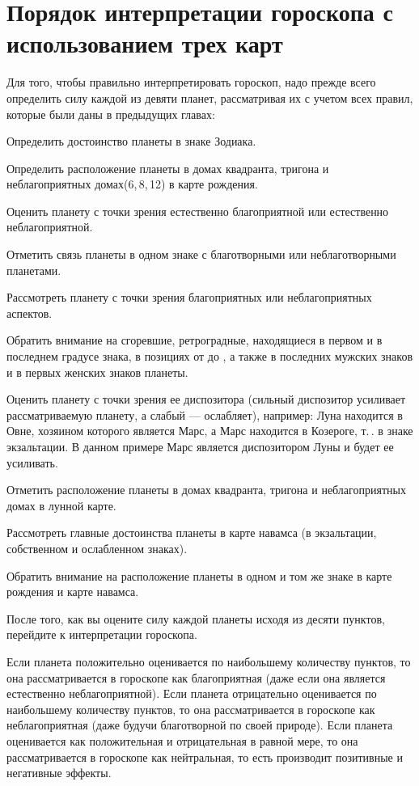 \section{Порядок интерпретации гороскопа с использованием трех карт}

Для того, чтобы правильно интерпретировать гороскоп, надо прежде всего определить силу каждой из девяти планет, рассматривая их с учетом всех правил, которые были даны в предыдущих главах:
\begin{myenum}
	\item Определить достоинство планеты в знаке Зодиака.
	\item Определить расположение планеты в домах квадранта, тригона и неблагоприятных домах(6,\,8,\,12) в карте рождения.
	\item Оценить планету с точки зрения естественно благоприятной или естественно неблагоприятной.
	\item Отметить связь планеты в одном знаке с благотворными или неблаготворными планетами.
	\item Рассмотреть планету с точки зрения благоприятных или неблагоприятных аспектов.
	\item Обратить внимание на сгоревшие, ретроградные, находящиеся в первом и в последнем градусе знака, в позициях от  до , а также в последних  мужских знаков и в первых  женских знаков планеты.
	\item Оценить планету с точки зрения ее диспозитора (сильный диспозитор усиливает рассматриваемую планету, а слабый --- ослабляет), например: Луна находится в Овне, хозяином которого является Марс, а Марс находится в Козероге, т.\,\е. в знаке экзальтации. В данном примере Марс является диспозитором Луны и будет ее усиливать.
	\item Отметить расположение планеты в домах квадранта, тригона и неблагоприятных домах в лунной карте.
	\item Рассмотреть главные достоинства планеты в карте навамса (в экзальтации, собственном и ослабленном знаках).
	\item Обратить внимание на расположение планеты в одном и том же знаке в карте рождения и карте навамса.
\end{myenum}


После того, как вы оцените силу каждой планеты исходя из десяти пунктов, перейдите к интерпретации гороскопа.

Если планета положительно оценивается по наибольшему количеству пунктов, то она рассматривается в гороскопе как благоприятная (даже если она является естественно неблагоприятной). Если планета отрицательно оценивается по наибольшему количеству пунктов, то она рассматривается в гороскопе как неблагоприятная (даже будучи благотворной по своей природе). Если планета оценивается как положительная и отрицательная в равной мере, то она рассматривается в гороскопе как нейтральная, то есть производит позитивные и негативные эффекты.

